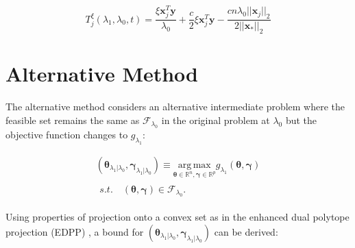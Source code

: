 \begin{equation}
    T^\xi_j(\lambda_1,\lambda_0,t)=\frac{\xi \boldsymbol x_j^T \boldsymbol y}{\lambda_0}+\frac{c}{2}\xi\boldsymbol x_j^T\boldsymbol y-\frac{cn\lambda_0||\boldsymbol x_j||_2}{2||\boldsymbol x_*||_2}
\end{equation}

\section{Alternative Method}

The alternative method considers an alternative intermediate problem where the feasible set remains the same as $\mathcal{F}_{\lambda_0}$ in the original problem at $\lambda_0$ but the objective function changes to $g_{\lambda_1}$:

\begin{gather}
        \label{eq:dualmialt}
        (\boldsymbol\theta_{\lambda_1|\lambda_0},\boldsymbol\gamma_{\lambda_1|\lambda_0})\equiv\underset{\boldsymbol\theta\in \mathbb{R}^{ n},\boldsymbol\gamma\in\mathbb{R}^p}{\mathrm{arg\,max}}g_{\lambda_1}(\boldsymbol\theta,\boldsymbol\gamma)\\
        \begin{aligned}s.t.\quad (\boldsymbol\theta,\boldsymbol\gamma)\in \mathcal{F}_{\lambda_0}\nonumber.
        \end{aligned}
\end{gather}

Using properties of projection onto a convex set as in the enhanced dual polytope projection (EDPP) \citep{wang2013lasso}, a bound for $(\boldsymbol\theta_{\lambda_1|\lambda_0},\boldsymbol\gamma_{\lambda_1|\lambda_0})$ can be derived:

